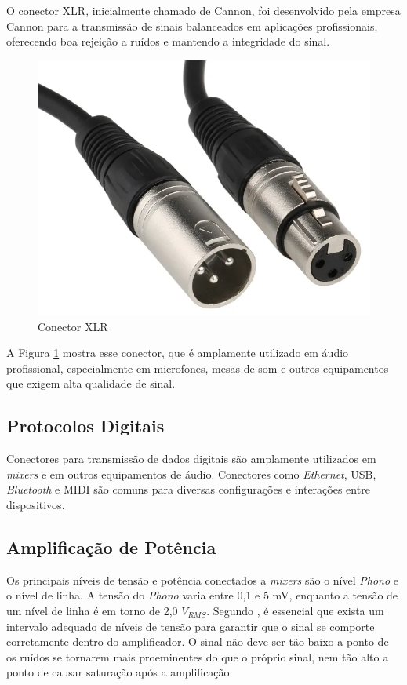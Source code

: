 O conector XLR, inicialmente chamado de Cannon, foi desenvolvido pela empresa Cannon para a transmissão de sinais balanceados em aplicações profissionais, oferecendo boa rejeição a ruídos e mantendo a integridade do sinal.

\begin{figure}[h]
	\centering
    \includegraphics[scale=0.2]{figuras/fig23.png}
	\caption{Conector XLR}
	\label{fig23}
\end{figure}

A Figura \ref{fig23} mostra esse conector, que é amplamente utilizado em áudio profissional, especialmente em microfones, mesas de som e outros equipamentos que exigem alta qualidade de sinal.

\subsection{Protocolos Digitais}

Conectores para transmissão de dados digitais são amplamente utilizados em \textit{mixers} e em outros equipamentos de áudio. Conectores como \textit{Ethernet}, USB, \textit{Bluetooth} e MIDI são comuns para diversas configurações e interações entre dispositivos.

\subsection{Amplificação de Potência}

Os principais níveis de tensão e potência conectados a \textit{mixers} são o nível \textit{Phono} e o nível de linha. A tensão do \textit{Phono} varia entre 0,1 e 5 mV, enquanto a tensão de um nível de linha é em torno de 2,0 $V_{RMS}$. Segundo \cite{self2013audio}, é essencial que exista um intervalo adequado de níveis de tensão para garantir que o sinal se comporte corretamente dentro do amplificador. O sinal não deve ser tão baixo a ponto de os ruídos se tornarem mais proeminentes do que o próprio sinal, nem tão alto a ponto de causar saturação após a amplificação. 

